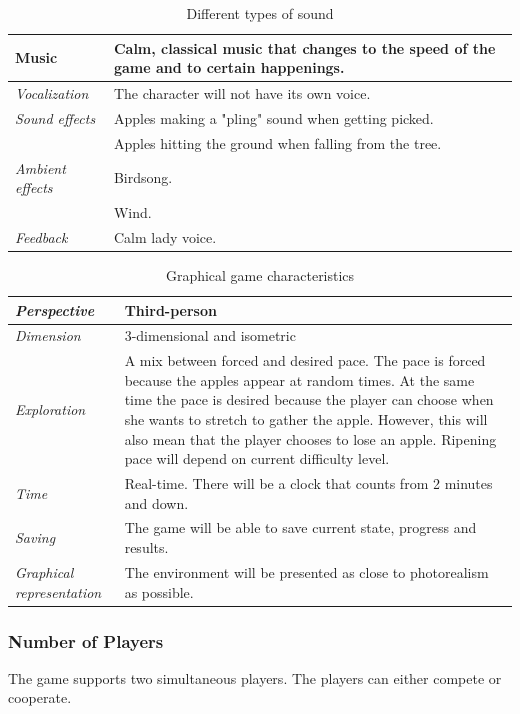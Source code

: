 \begin{table} [H]
\centering
\begin{tabular}{|p{}|p{}|}
\hline
{Music} & Calm, classical music that changes to the speed of the game and to certain happenings. \\ \hline
\emph{Vocalization} & The character will not have its own voice. \\ \hline
\emph{Sound effects} & Apples making a "pling" sound when getting picked.  \\ \cline{2-2}
&  Apples hitting the ground when falling from the tree. \\ \hline
\emph{Ambient effects} & Birdsong. \\ \cline{2-2}
& Wind. \\ \hline
\emph{Feedback} & Calm lady voice. \\ \hline
\end{tabular}
\caption[Different types of sounds in the "Apple Picking" game]{Different types of sound}
\label{tab:sound2}
\end{table}  

\begin{table} [H]
\centering
\begin{tabular}{|p{}|p{}|}
\hline
\emph {Perspective} & Third-person \\ \hline
\emph{Dimension} &  3-dimensional and isometric \\ \hline
\emph{Exploration} &  A mix between forced and desired pace. The pace is forced because the apples appear at random times. At the same time the pace is desired because the player can choose when she wants to stretch to gather the apple. However, this will also mean that the player chooses to lose an apple. Ripening pace will depend on current difficulty level.\\ \hline
\emph{Time} & Real-time. There will be a clock that counts from 2 minutes and down. \\ \hline
\emph{Saving} & The game will be able to save current state, progress and results. \\ \hline
\emph{Graphical representation} & The environment will be presented as close to photorealism as possible.  \\ \hline
\end{tabular}
\caption[Graphical game characteristics in the "Apple Picking" game]{Graphical game characteristics}
\label{tab:graphical2}
\end{table}  

\subsubsection{Number of Players} 
The game supports two simultaneous players. The players can either compete or cooperate. 


